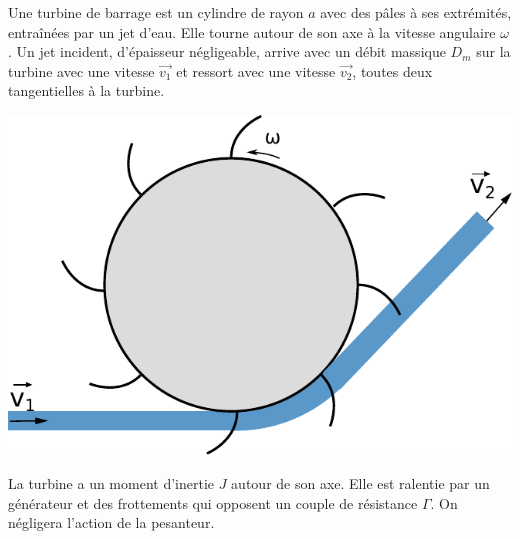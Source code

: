 \documentclass{report}
\begin{document}
Une turbine de barrage est un cylindre de rayon $a$ avec des pâles à ses extrémités, entraînées par un jet d'eau. Elle tourne autour de son axe à la vitesse angulaire $\omega$. Un jet incident, d'épaisseur négligeable, arrive avec un débit massique $D_m$ sur la turbine avec une vitesse $\vec{v_1}$ et ressort avec une vitesse $\vec{v_2}$, toutes deux tangentielles à la turbine.

\begin{center}
	\includegraphics[scale=0.5]{meca_flu7.pdf}
\end{center}

La turbine a un moment d'inertie $J$ autour de son axe. Elle est ralentie par un générateur et des frottements qui opposent un couple de résistance $\Gamma$. On négligera l'action de la pesanteur.
\end{document}
